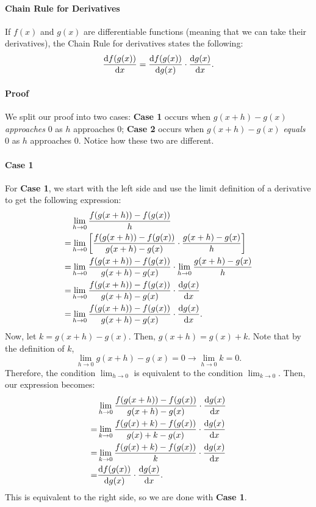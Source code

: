 \documentclass{article}
\begin{document}
\paragraph{Chain Rule for Derivatives} If $f(x)$ and $g(x)$ are differentiable functions (meaning that we can take their derivatives), the Chain Rule for derivatives states the following:
\[\diff{f(g(x))}{x}=\diff{f(g(x))}{g(x)}\cdot \diff{g(x)}{x}.\]

\paragraph{Proof} We split our proof into two cases: \textbf{Case 1} occurs when $g(x+h)-g(x)$ \textit{approaches} 0 as $h$ approaches 0; \textbf{Case 2} occurs when $g(x+h)-g(x)$ \textit{equals} 0 as $h$ approaches 0. Notice how these two are different.

\paragraph{Case 1} For \textbf{Case 1}, we start with the left side and use the limit definition of a derivative to get the following expression:
\begin{align*}
    &\lim_{h\to 0}\frac{f(g(x+h))-f(g(x))}{h}\\
    =& \lim_{h\to 0}\left[\frac{f(g(x+h))-f(g(x))}{g(x+h)-g(x)}\cdot \frac{g(x+h)-g(x)}{h}\right]\\
    =& \lim_{h\to 0}\frac{f(g(x+h))-f(g(x))}{g(x+h)-g(x)}\cdot \lim_{h\to 0}\frac{g(x+h)-g(x)}{h}\\
    =& \lim_{h\to 0}\frac{f(g(x+h))-f(g(x))}{g(x+h)-g(x)}\cdot \diff{g(x)}{x}\\
    =& \lim_{h\to 0}\frac{f(g(x+h))-f(g(x))}{g(x+h)-g(x)}\cdot \diff{g(x)}{x}.
\end{align*}
Now, let $k=g(x+h)-g(x)$. Then, $g(x+h)=g(x)+k$. Note that by the definition of $k$, 
\[\lim_{h\to 0}g(x+h)-g(x)=0\to \lim_{h\to 0}k=0.\]
Therefore, the condition $\lim_{h\to 0}$ is equivalent to the condition $\lim_{k\to 0}$. Then, our expression becomes: 
\begin{align*}
    &\lim_{h\to 0}\frac{f(g(x+h))-f(g(x))}{g(x+h)-g(x)}\cdot \diff{g(x)}{x}\\
    =& \lim_{k\to 0}\frac{f(g(x)+k)-f(g(x))}{g(x)+k-g(x)}\cdot \diff{g(x)}{x}\\
    =& \lim_{k\to 0}\frac{f(g(x)+k)-f(g(x))}{k}\cdot \diff{g(x)}{x}\\
    =& \diff{f(g(x))}{g(x)}\cdot \diff{g(x)}{x}.
\end{align*}
This is equivalent to the right side, so we are done with \textbf{Case 1}.
\end{document}
